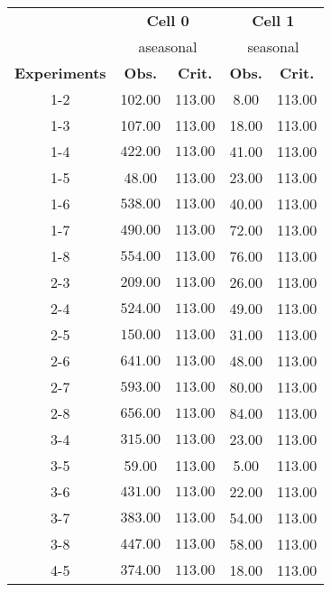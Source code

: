 \begin{table}[ht]
\centering
\begin{tabular*}{\textwidth}{@{\extracolsep{\fill} }ccccc}
  \toprule
& \multicolumn{2}{c}{\textbf{Cell 0}} & \multicolumn{2}{c}{\textbf{Cell 1}} \\
& \multicolumn{2}{c}{aseasonal} & \multicolumn{2}{c}{seasonal} \\
\cmidrule(lr){2-3} \cmidrule(lr){4-5}
\textbf{Experiments} & \textbf{Obs.} & \textbf{Crit.} & \textbf{Obs.} & \textbf{Crit.} \\ 
  \midrule
1-2 & 102.00 & 113.00 & 8.00 & 113.00 \\ 
  1-3 & 107.00 & 113.00 & 18.00 & 113.00 \\ 
  1-4 & \(\mathbf{422.00}\) & \(\mathbf{113.00}\) & 41.00 & 113.00 \\ 
  1-5 & 48.00 & 113.00 & 23.00 & 113.00 \\ 
  1-6 & \(\mathbf{538.00}\) & \(\mathbf{113.00}\) & 40.00 & 113.00 \\ 
  1-7 & \(\mathbf{490.00}\) & \(\mathbf{113.00}\) & 72.00 & 113.00 \\ 
  1-8 & \(\mathbf{554.00}\) & \(\mathbf{113.00}\) & 76.00 & 113.00 \\ 
   [1ex]2-3 & \(\mathbf{209.00}\) & \(\mathbf{113.00}\) & 26.00 & 113.00 \\ 
  2-4 & \(\mathbf{524.00}\) & \(\mathbf{113.00}\) & 49.00 & 113.00 \\ 
  2-5 & \(\mathbf{150.00}\) & \(\mathbf{113.00}\) & 31.00 & 113.00 \\ 
  2-6 & \(\mathbf{641.00}\) & \(\mathbf{113.00}\) & 48.00 & 113.00 \\ 
  2-7 & \(\mathbf{593.00}\) & \(\mathbf{113.00}\) & 80.00 & 113.00 \\ 
  2-8 & \(\mathbf{656.00}\) & \(\mathbf{113.00}\) & 84.00 & 113.00 \\ 
   [1ex]3-4 & \(\mathbf{315.00}\) & \(\mathbf{113.00}\) & 23.00 & 113.00 \\ 
  3-5 & 59.00 & 113.00 & 5.00 & 113.00 \\ 
  3-6 & \(\mathbf{431.00}\) & \(\mathbf{113.00}\) & 22.00 & 113.00 \\ 
  3-7 & \(\mathbf{383.00}\) & \(\mathbf{113.00}\) & 54.00 & 113.00 \\ 
  3-8 & \(\mathbf{447.00}\) & \(\mathbf{113.00}\) & 58.00 & 113.00 \\ 
   [1ex]4-5 & \(\mathbf{374.00}\) & \(\mathbf{113.00}\) & 18.00 & 113.00 \\ 

\end{tabular*}
\end{table}
